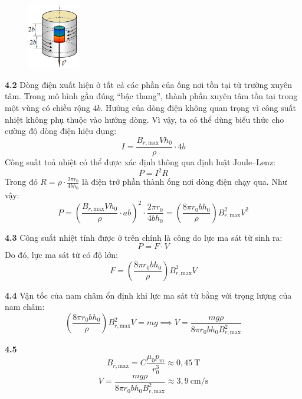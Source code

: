 \begin{figure}
  \centering
  \vspace{-0.5cm}\hspace{-1cm}
  \includegraphics[width=0.2\textwidth]{Figures/Solutions/Fig 2.9.png}
\end{figure}
\noindent\textbf{4.2} Dòng điện xuất hiện ở tất cả các phần của ống nơi tồn tại từ trường xuyên tâm. Trong mô hình gần đúng “bậc thang”, thành phần xuyên tâm tồn tại trong một vùng có chiều rộng $4b$. Hướng của dòng điện không quan trọng vì công suất nhiệt không phụ thuộc vào hướng dòng. Vì vậy, ta có thể dùng biểu thức cho cường độ dòng điện hiệu dụng:
\begin{equation*}
  I = \frac{B_{r,\text{max}} V h_0}{\rho} \cdot 4b
\end{equation*}
Công suất toả nhiệt có thể được xác định thông qua định luật Joule–Lenz:
\begin{equation*}
  P = I^2 R
\end{equation*}
Trong đó $R = \rho \cdot \frac{2\pi r_0}{4b h_0}$ là điện trở phần thành ống nơi dòng điện chạy qua. Như vậy:
\begin{equation*}
  P = \left( \frac{B_{r,\text{max}} V h_0}{\rho} \cdot ab \right)^2 \cdot \frac{2\pi r_0}{4b h_0}   = \left( \frac{8\pi r_0 b h_0}{\rho} \right) B_{r,\text{max}}^2 V^2
\end{equation*}

\noindent\textbf{4.3} Công suất nhiệt tính được ở trên chính là công do lực ma sát từ sinh ra:
\begin{equation*}
  P = F \cdot V
\end{equation*}
Do đó, lực ma sát từ có độ lớn:
\begin{equation*}
  F = \left( \frac{8\pi r_0 b h_0}{\rho} \right) B_{r,\text{max}}^2 V
\end{equation*}

\noindent\textbf{4.4} Vận tốc của nam châm ổn định khi lực ma sát từ bằng với trọng lượng của nam châm:
\begin{equation*}
  \left( \frac{8\pi r_0 b h_0}{\rho} \right) B_{r,\text{max}}^2 V = mg \implies V = \frac{mg \rho}{8\pi r_0 b h_0 B_{r,\text{max}}^2}
\end{equation*}

\noindent\textbf{4.5}
\begin{equation*}
  B_{r,\text{max}} = C \frac{\mu_0 p_m}{r_0^3} \approx 0{,}45~\text{T}
\end{equation*}
\begin{equation*}
  V = \frac{mg \rho}{8\pi r_0 b h_0 B_{r,\text{max}}^2} \approx 3{,}9~\text{cm/s}
\end{equation*}


